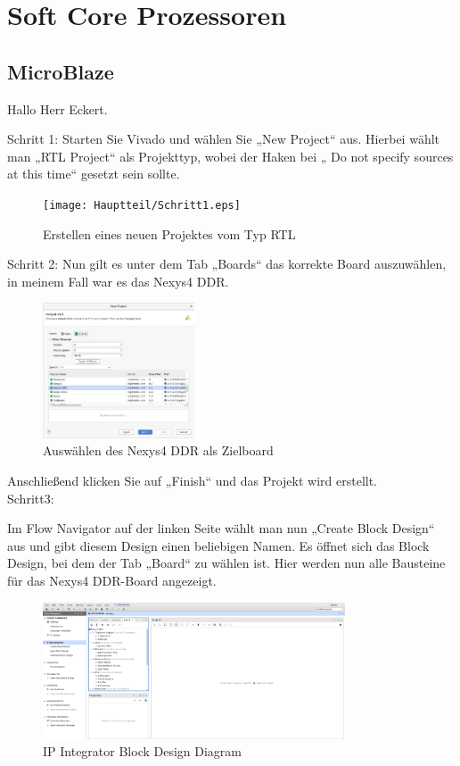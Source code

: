 
\chapter{Soft Core Prozessoren}\label{kap:softcoreprozessoren}
\newpage
\section{MicroBlaze}\label{kap:microblaze}

Hallo Herr Eckert. 

Schritt 1:
Starten Sie Vivado und wählen Sie „New Project“ aus.
Hierbei wählt man „RTL Project“ als Projekttyp, wobei der Haken bei „ Do not specify sources at this time“ gesetzt sein sollte.\\

\begin{figure}[H]
\centering
\texttt{[image: Hauptteil/Schritt1.eps]}
\caption{Erstellen eines neuen Projektes vom Typ RTL}
\label{fig:mbschritt1}
\end{figure}


Schritt 2:
Nun gilt es unter dem Tab „Boards“ das korrekte Board auszuwählen, in meinem Fall war es das Nexys4 DDR.


\begin{figure}[H]
\centering
\includegraphics[width=0.4\textwidth]{Hauptteil/schritt2.png}
\caption{Auswählen des Nexys4 DDR als Zielboard}
\label{fig:mbschritt2}
\end{figure}

Anschließend klicken Sie auf „Finish“ und das Projekt wird erstellt.\\

\newpage
Schritt3:

Im Flow Navigator  auf der linken Seite wählt man nun „Create Block Design“ aus und gibt diesem Design einen beliebigen Namen.
Es öffnet sich das Block Design, bei dem der Tab „Board“ zu wählen ist. Hier werden nun alle Bausteine für das Nexys4 DDR-Board angezeigt.\\

\begin{figure}[H]
\centering
\includegraphics[width=0.8\textwidth]{Hauptteil/schritt3.png}
\caption{IP Integrator Block Design Diagram}
\label{fig:mbschritt3}
\end{figure}


